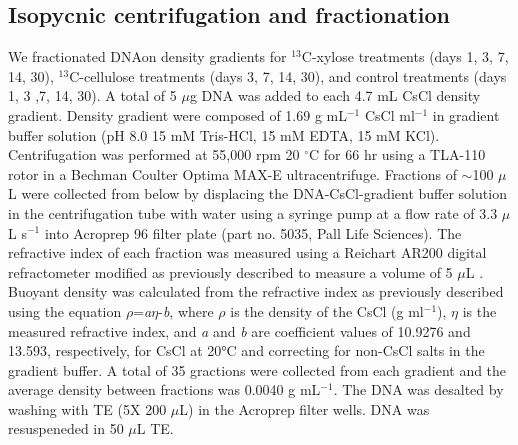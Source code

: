 \documentclass{article}
\begin{document}
\subsection{Isopycnic centrifugation and fractionation} We fractionated DNAon
density gradients for $^{13}$C-xylose treatments (days 1, 3, 7, 14, 30),
$^{13}$C-cellulose treatments (days 3, 7, 14, 30), and control treatments (days
1, 3 ,7, 14, 30). A total of 5 $\mu$g DNA was added to each 4.7 mL CsCl density
gradient.  Density gradient were composed of 1.69 g mL$^{-1}$ CsCl ml$^{-1}$ in
gradient buffer solution (pH 8.0 15 mM Tris-HCl, 15 mM EDTA, 15 mM KCl).
Centrifugation was performed at 55,000 rpm 20 $^{\circ}$C for 66 hr using
a TLA-110 rotor in a Bechman Coulter Optima MAX-E ultracentrifuge. Fractions of
$\sim$100 $\mu$L were collected from below by displacing the DNA-CsCl-gradient
buffer solution in the centrifugation tube with water using a syringe pump at
a flow rate of 3.3 $\mu$L s$^{-1}$ \citep{Manefield_2002} into Acroprep 96
filter plate (part no. 5035, Pall Life Sciences). The refractive index of each
fraction was measured using a Reichart AR200 digital refractometer modified as
previously described to measure a volume of 5 $\mu$L \citep{Buckley_2007}.
Buoyant density was calculated from the refractive index as previously
described \citep{Buckley_2007} using the equation
$\rho$=\textit{a}$\eta$-\textit{b}, where $\rho$ is the density of the CsCl (g
ml$^{-1}$), $\eta$ is the measured refractive index, and \textit{a} and
\textit{b} are coefficient values of 10.9276 and 13.593, respectively, for CsCl
at 20°C \citep{9780408708036} and correcting for non-CsCl salts in the gradient
buffer. A total of 35 gractions were collected from each gradient and the
average density between fractions was 0.0040 g mL$^{-1}$. The DNA was desalted
by washing with TE (5X 200 $\mu$L) in the Acroprep filter wells. DNA was
resuspeneded in 50 $\mu$L TE. 
\end{document}

